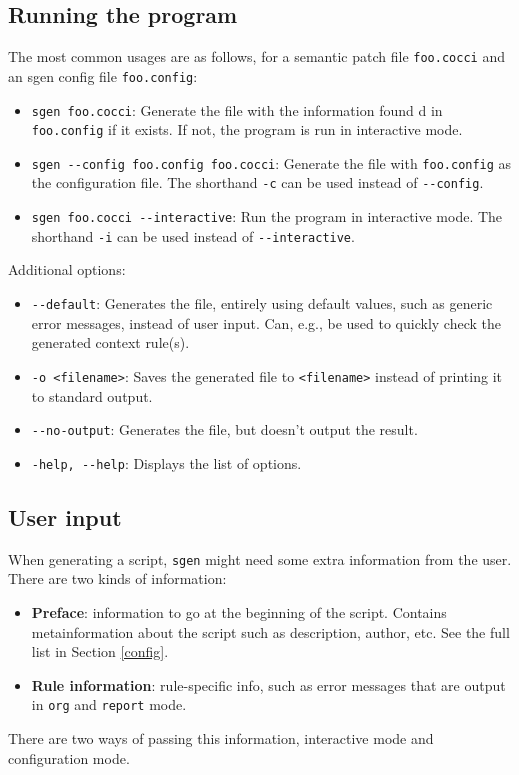 \subsection{Running the program}
The most common usages are as follows, for a semantic patch file \texttt{foo.cocci} and an sgen config file \texttt{foo.config}:
\begin{itemize}
\item \texttt{sgen foo.cocci}: Generate the file with the information found
d in \texttt{foo.config} if it exists. If not, the program is run in interactive mode.
\item \texttt{sgen -{}-config foo.config foo.cocci}: Generate the file with
  \texttt{foo.config} as the configuration file. The shorthand \texttt{-c} can be used instead of \texttt{-{}-config}.
\item \texttt{sgen foo.cocci -{}-interactive}: Run the program in interactive mode. The shorthand \texttt{-i} can be used instead of \texttt{-{}-interactive}.
\end{itemize}
Additional options:
\begin{itemize}
\item \texttt{-{}-default}: Generates the file, entirely using default values, such as generic error messages, instead of user input. Can, e.g., be used to quickly check the generated context rule(s).
\item \texttt{-o <filename>}: Saves the generated file to \texttt{<filename>} instead of printing it to standard output.
\item \texttt{-{}-no-output}: Generates the file, but doesn't output the result.
\item \texttt{-help, -{}-help}: Displays the list of options.
\end{itemize}
\bigskip

\subsection{User input}
When generating a script, \texttt{sgen} might need some extra information from the user. There are two kinds of information:
\begin{itemize}
\item \textbf{Preface}: information to go at the beginning of the script. Contains metainformation about the script such as description, author, etc. See the full list in Section \ref{config}.
\item \textbf{Rule information}: rule-specific info, such as error messages that are output in \texttt{org} and \texttt{report} mode.
\end{itemize}
There are two ways of passing this information, interactive mode and configuration mode.
\bigskip

